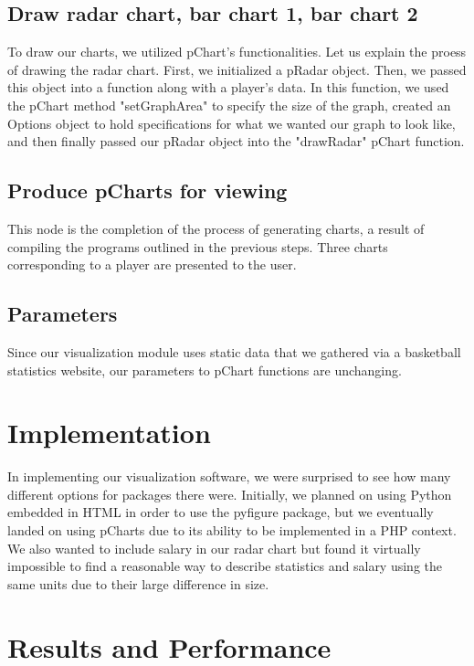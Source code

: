 \documentclass[journal]{vgtc}                %
\begin{document}
\subsection{Draw radar chart, bar chart 1, bar chart 2}
To draw our charts, we utilized pChart's functionalities. Let us explain the proess of drawing the radar chart. First, we initialized a pRadar object. Then, we passed this object into a function along with a player's data. In this function, we used the pChart method "setGraphArea" to specify the size of the graph, created an Options object to hold specifications for what we wanted our graph to look like, and then finally passed our pRadar object into the "drawRadar" pChart function.
\subsection{Produce pCharts for viewing}
This node is the completion of the process of generating charts, a result of compiling the programs outlined in the previous steps. Three charts corresponding to a player are presented to the user.
\subsection{Parameters}
Since our visualization module uses static data that we gathered via a basketball statistics website, our parameters to pChart functions are unchanging. 
\section{Implementation}
In implementing our visualization software, we were surprised to see how many different options for packages there were. Initially, we planned on using Python embedded in HTML in order to use the pyfigure package, but we eventually landed on using pCharts due to its ability to be implemented in a PHP context. We also wanted to include salary in our radar chart but found it virtually impossible to find a reasonable way to describe statistics and salary using the same units due to their large difference in size. 
\section{Results and Performance}
\end{document}
